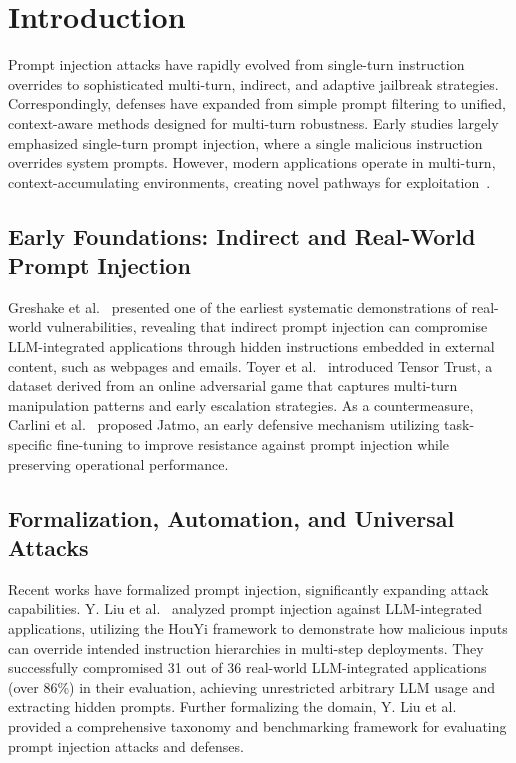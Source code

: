\documentclass[10pt, a4paper, twocolumn]{article}
\begin{document}
\section{Introduction}

Prompt injection attacks have rapidly evolved from single-turn instruction overrides to sophisticated multi-turn, indirect, and adaptive jailbreak strategies. Correspondingly, defenses have expanded from simple prompt filtering to unified, context-aware methods designed for multi-turn robustness. Early studies largely emphasized single-turn prompt injection, where a single malicious instruction overrides system prompts. However, modern applications operate in multi-turn, context-accumulating environments, creating novel pathways for exploitation~\cite{ha2025, huang2024}.

\subsection{Early Foundations: Indirect and Real-World Prompt Injection}
Greshake et al.~\cite{greshake2023} presented one of the earliest systematic demonstrations of real-world vulnerabilities, revealing that indirect prompt injection can compromise LLM-integrated applications through hidden instructions embedded in external content, such as webpages and emails. Toyer et al.~\cite{toyer2023} introduced Tensor Trust, a dataset derived from an online adversarial game that captures multi-turn manipulation patterns and early escalation strategies. As a countermeasure, Carlini et al.~\cite{carlini2023} proposed Jatmo, an early defensive mechanism utilizing task-specific fine-tuning to improve resistance against prompt injection while preserving operational performance.

\subsection{Formalization, Automation, and Universal Attacks}
Recent works have formalized prompt injection, significantly expanding attack capabilities. Y. Liu et al.~\cite{liu2023houyi} analyzed prompt injection against LLM-integrated applications, utilizing the HouYi framework to demonstrate how malicious inputs can override intended instruction hierarchies in multi-step deployments. They successfully compromised 31 out of 36 real-world LLM-integrated applications (over 86\%) in their evaluation, achieving unrestricted arbitrary LLM usage and extracting hidden prompts. Further formalizing the domain, Y. Liu et al.~\cite{liu2024taxonomy} provided a comprehensive taxonomy and benchmarking framework for evaluating prompt injection attacks and defenses. 
\end{document}
